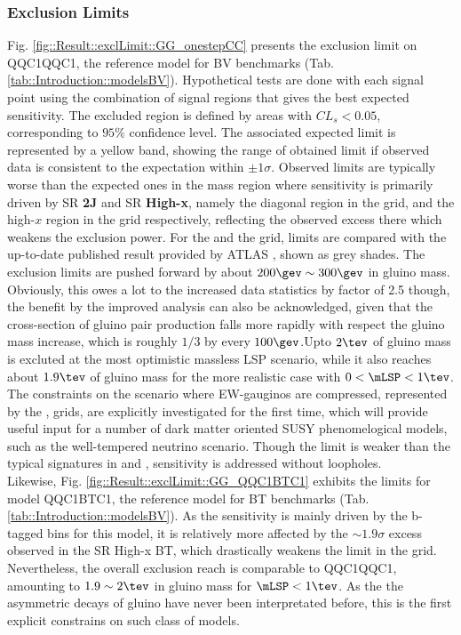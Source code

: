 \subsubsection{Exclusion Limits}
Fig. \ref{fig::Result::exclLimit::GG_onestepCC} presents the exclusion limit on QQC1QQC1, the reference model for BV benchmarks (Tab. \ref{tab::Introduction::modelsBV}). Hypothetical tests are done with each signal point using the combination of signal regions that gives the best expected sensitivity. The excluded region is defined by areas with $CL_s<0.05$, corresponding to $95\%$ confidence level. The associated expected limit is represented by a yellow band, showing the range of obtained limit if observed data is consistent to the expectation within $\pm1\sigma$. Observed limits are typically worse than the expected ones in the mass region where sensitivity is primarily driven by SR \textbf{2J} and SR \textbf{High-x}, namely the diagonal region in the \xhalf grid, and the high-$x$ region in the \varx grid respectively, reflecting the observed excess there which weakens the exclusion power. For the \xhalf and the \varx grid, limits are compared with the up-to-date published result provided by ATLAS \cite{strong1L_ICHEP2016_CONF}, shown as grey shades. The exclusion limits are pushed forward by about $200\gev\sim300\gev$ in gluino mass. Obviously, this owes a lot to the increased data statistics by factor of 2.5 though, the benefit by the improved analysis can also be acknowledged, given that the cross-section of gluino pair production falls more rapidly with respect the gluino mass increase, which is roughly $1/3$ by every $100\gev$.Upto $2\tev$ of gluino mass is excluted at the most optimistic massless LSP scenario, while it also reaches about $1.9\tev$ of gluino mass for the more realistic case with $0<\mLSP<1\tev$. 
% 
The constraints on the scenario where EW-gauginos are compressed, 
represented by the \DMth, \DMtw grids,
are explicitly investigated for the first time, which will provide useful input for a number of dark matter oriented SUSY phenomelogical models, such as the well-tempered neutrino scenario.
Though the limit is weaker than the typical signatures in \xhalf and \varx, sensitivity is addressed without loopholes. \\

Likewise, Fig. \ref{fig::Result::exclLimit::GG_QQC1BTC1} exhibits the limits for model QQC1BTC1, the reference model for BT benchmarks (Tab. \ref{tab::Introduction::modelsBV}). As the sensitivity is mainly driven by the b-tagged bins for this model, it is relatively more affected by the $\sim 1.9\sigma$ excess observed in the SR High-x BT, which drastically weakens the limit in the \varx grid. Nevertheless, the overall exclusion reach is comparable to QQC1QQC1, amounting to $1.9\sim2\tev$ in gluino mass for $\mLSP <1\tev$. As the the asymmetric decays of gluino have never been interpretated before, this is the first explicit constrains on such class of models. \\

